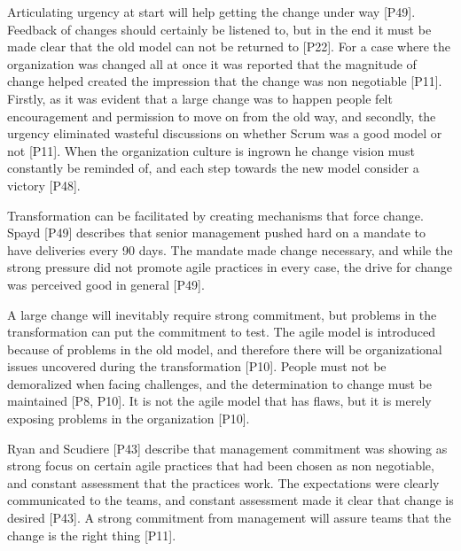 
Articulating urgency at start will help getting the change under way [P49].
Feedback of changes should certainly be listened to, but in the end it must be
made clear that the old model can not be returned to [P22].
For a case where the organization was changed all at once it was reported that
the magnitude of change helped created the impression that the change was non
negotiable [P11]. Firstly, as it was evident that a large change was to happen
people felt encouragement and permission to move on from the old way, and
secondly, the urgency eliminated wasteful discussions on whether Scrum was a
good model or not [P11].
When the organization culture is ingrown he change vision must constantly be
reminded of, and each step towards the new model consider a victory [P48].


Transformation can be facilitated by creating mechanisms that force change.
Spayd [P49] describes that senior management pushed hard on a mandate to have
deliveries every 90 days. The mandate made change necessary, and while the
strong pressure did not promote agile practices in every case, the drive for
change was perceived good in general [P49].


A large change will inevitably require strong commitment, but problems in the
transformation can put the commitment to test. The agile model is introduced
because of problems in the old model, and therefore there will be organizational
issues uncovered during the transformation [P10]. People must not be demoralized
when facing challenges, and the determination to change must be maintained [P8,
P10]. It is not the agile model that has flaws, but it is merely exposing
problems in the organization [P10].

Ryan and Scudiere [P43] describe that management commitment was showing as
strong focus on certain agile practices that had been chosen as non negotiable,
and constant assessment that the practices work. The expectations were clearly
communicated to the teams, and constant assessment made it clear that change is
desired [P43].
A strong commitment from management will assure teams that the change is the
right thing [P11].



